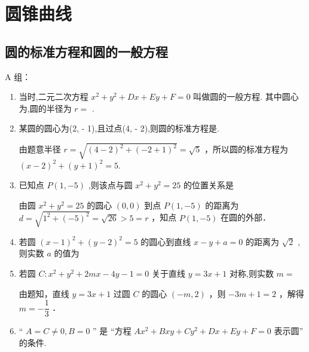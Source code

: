 \chapter*{圆锥曲线}

\section*{圆的标准方程和圆的一般方程}


A 组：

\begin{enumerate}

    \item 当时,二元二次方程 ${x}^{2} + {y}^{2} + {Dx} + {Ey} + F = 0$ 叫做圆的一般方程. 其中圆心为,圆的半径为 $r =$ .

    \item 某圆的圆心为(2, - 1),且过点(4, - 2),则圆的标准方程是.
    \begin{jieda}
        由题意半径 $r=\sqrt{(4-2)^2+(-2+1)^2}=\sqrt{5}$ ，所以圆的标准方程为 $(x-2)^2+(y+1)^2=5$.
    \end{jieda}

    \item 已知点 $P(1,-5)$ ,则该点与圆 ${x}^{2} + {y}^{2} = {25}$ 的位置关系是
    \begin{jieda}
        由圆 $x^2+y^2=25$ 的圆心 $(0,0)$ 到点 $P(1,-5)$ 的距离为 $d=\sqrt{1^2+(-5)^2}=\sqrt{26}>5=r$ ，知点 $P(1,-5)$ 在圆的外部．
    \end{jieda}

    \item 若圆 ${\left( x - 1\right) }^{2} + {\left( y - 2\right) }^{2} = 5$ 的圆心到直线 $x - y + a = 0$ 的距离为 $\sqrt{2}$ ,则实数 $a$ 的值为

    \item 若圆 $C : {x}^{2} + {y}^{2} + {2mx} - {4y} - 1 = 0$ 关于直线 $y = {3x} + 1$ 对称,则实数 $m =$ 
    \begin{jieda}
        由题知，直线 $y=3 x+1$ 过圆 $C$ 的圆心 $(-m, 2)$ ，则 $-3 m+1=2$ ，解得 $m=-\dfrac{1}{3}$ ．
    \end{jieda}
    
    \item “ $A = C \neq  0,B = 0$ ” 是 “方程 $A{x}^{2} + {Bxy} + C{y}^{2} + {Dx} + {Ey} + F = 0$ 表示圆” 的条件.


\end{enumerate}
